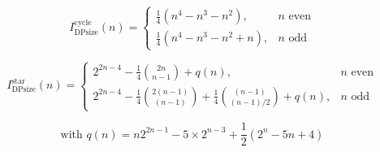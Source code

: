 \documentclass[12pt]{article}
\begin{document}
\begin{flushleft}
\[
I^{\text{cycle}}_{\text{DPsize}}(n) =
\begin{cases}
    \frac{1}{4} (n^4 - n^3 - n^2), & n \text{ even} \\
    \frac{1}{4} (n^4 - n^3 - n^2 + n), & n \text{ odd}
\end{cases}
\]

\[
I^{\text{star}}_{\text{DPsize}}(n) =
\begin{cases}
    2^{2n-4} - \frac{1}{4} \binom{2n}{n-1} + q(n), & n \text{ even} \\
    2^{2n-4} - \frac{1}{4} \binom{2(n-1)}{(n-1)} + \frac{1}{4} \binom{(n-1)}{(n-1)/2} + q(n), & n \text{ odd}
\end{cases}
\]

\[
\text{with } q(n) = n 2^{2n-1} - 5 \times 2^{n-3} + \frac{1}{2} (2^n - 5n + 4)
\]


\end{flushleft}
\end{document}

